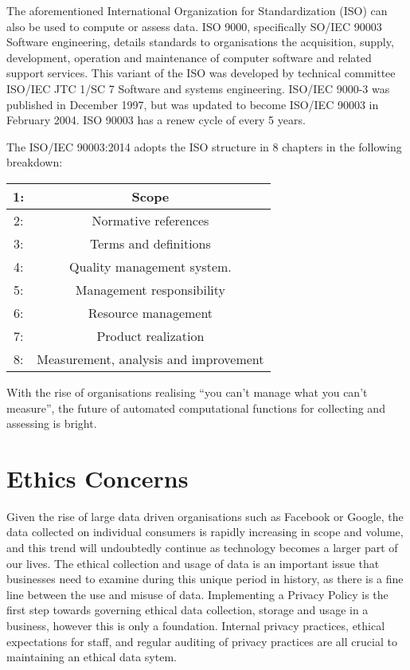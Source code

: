 \documentclass{article}
\begin{document}
The aforementioned International Organization for Standardization (ISO) can also be used to compute or assess data. ISO 9000, specifically SO/IEC 90003 Software engineering, details standards to organisations the acquisition, supply, development, operation and maintenance of computer software and related support services. This variant of the ISO was developed by technical committee ISO/IEC JTC 1/SC 7 Software and systems engineering. ISO/IEC 9000-3 was published in December 1997, but was updated to become ISO/IEC 90003 in February 2004. ISO 90003 has a renew cycle of every 5 years. \cite{iso}

The ISO/IEC 90003:2014 adopts the ISO structure in 8 chapters in the following breakdown:

\begin{center}
\begin{tabular}{||c c||} 
\hline
1: & Scope \\ 
\hline
2: & Normative references \\ 
\hline
3: & Terms and definitions \\
\hline
4: & Quality management system. \\
\hline
5: & Management responsibility \\
\hline
6: & Resource management \\ 
\hline
7: & Product realization \\
\hline
8: & Measurement, analysis and improvement \\
\hline
\end{tabular}
\end{center}

With the rise of organisations realising ``you can't manage what you can't measure'', the future of automated computational functions for collecting and assessing is bright. 

\section {Ethics Concerns} Given the rise of large data driven organisations such as Facebook or Google, the data collected on individual consumers is rapidly increasing in scope and volume, and this trend will undoubtedly continue as technology becomes a larger part of our lives. The ethical collection and usage of data is an important issue that businesses need to examine during this unique period in history, as there is a fine line between the use and misuse of data. Implementing a Privacy Policy is the first step towards governing ethical data collection, storage and usage in a business, however this is only a foundation. Internal privacy practices, ethical expectations for staff, and regular auditing of privacy practices are all crucial to maintaining an ethical data sytem. \newline
\end{document}
